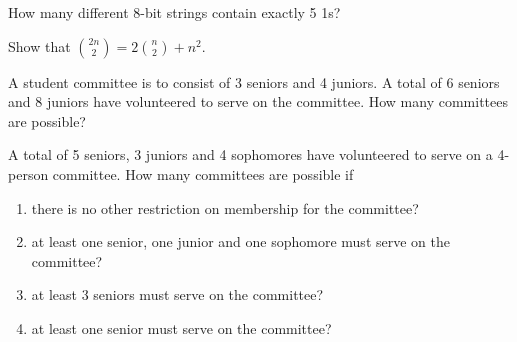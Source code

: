 \documentclass{homework}
\begin{document}
\question How many different 8-bit strings contain exactly 5 1s?

\question Show that $\binom{2n}{2} =2\binom{n}{2} + n^2$.

\question A student committee is to consist of 3 seniors and 4 juniors. A total of 6 seniors and 8 juniors have volunteered to serve on the committee. How many committees are possible?

\question A total of 5 seniors, 3 juniors and 4 sophomores have volunteered to serve on a 4-person committee. How many committees are possible if
\begin{enumerate}[label=(\alph*)]
    \item there is no other restriction on membership for the committee?
    \item at least one senior, one junior and one sophomore must serve on the committee?
    \item at least 3 seniors must serve on the committee?
    \item at least one senior must serve on the committee?
\end{enumerate}
\end{document}
